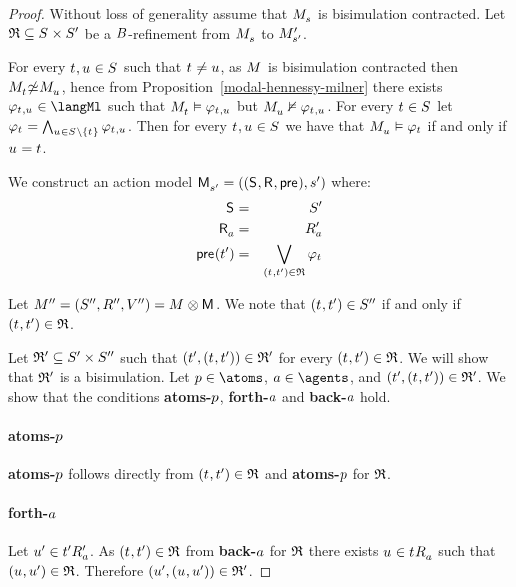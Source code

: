 \begin{proof}
Without loss of generality assume that $\kPModel{\kStateS}$ is bisimulation contracted.
Let $\refinement \subseteq \kStates \times \kStatesP$ be a $B$-refinement from $\kPModel{\kStateS}$ to ${M^{\prime}_{{s}^{\prime}}}$.

For every $\kStateT, \kStateU \in \kStates$ such that $\kStateT \neq \kStateU$, as $\kModel$ is bisimulation contracted then $\kPModel{\kStateT} \nbisimilar \kPModel{\kStateU}$, hence from Proposition~\ref{modal-hennessy-milner} there exists $\phi_{\kStateT, \kStateU} \in \langMl$ such that $\kPModel{\kStateT} \entails \phi_{\kStateT, \kStateU}$ but $\kPModel{\kStateU} \nentails \phi_{\kStateT, \kStateU}$.
For every $\kStateT \in \kStates$ let $\phi_{\kStateT} = \bigwedge_{\kStateU \in \kStates \setminus \{\kStateT\}} \phi_{\kStateT, \kStateU}$.
Then for every $\kStateT, \kStateU \in \kStates$ we have that $\kPModel{\kStateU} \entails \phi_{\kStateT}$ if and only if $\kStateU = \kStateT$.

We construct an action model $\aPModelAndTuple{\kStateSP}$ where:
\begin{eqnarray*}
    \aStates &=& \kStatesP\\
    \aAccessibilityA &=& \kAccessibilityPA\\
    \aPrecondition(\kStateTP) &=& \bigvee_{(\kStateT, \kStateTP) \in \refinement} \phi_{\kStateT}
\end{eqnarray*}

Let $\kModelAndTuplePP = \kModel \exec \aModel$. 
We note that $(\kStateT, \kStateTP) \in \kStatesPP$ if and only if $(\kStateT, \kStateTP) \in \refinement$.

Let $\mathfrak{R}' \subseteq {S^{\prime}} \times {S^{\prime\prime}}$ such that $(\kStateTP, (\kStateT, \kStateTP)) \in \bisimulation' $ for every $(\kStateT, \kStateTP) \in \refinement$.
We will show that $\mathfrak{R}'$ is a bisimulation.
Let $\atomP \in \atoms$, $\agentA \in \agents$, and $(\kStateTP, (\kStateT, \kStateTP)) \in \bisimulation'$.
We show that the conditions {\bf atoms-$p$}, {\bf forth-$a$} and {\bf back-$a$} hold.

\paragraph{atoms-$p$}
{\bf atoms-$p$} follows directly from $(\kStateT, \kStateTP) \in \refinement$ and {\bf atoms-$p$} for $\mathfrak{R}$.

\paragraph{forth-$a$}
Let ${u}^{\prime} \in {{t}^{\prime}} {R^{\prime}_{a}}$.
As $(\kStateT, \kStateTP) \in \refinement$ from {\bf back-$a$} for $\mathfrak{R}$ there exists $\kStateU \in \kSuccessorsA{\kStateT}$ such that $(\kStateU, \kStateUP) \in \refinement$.
Therefore $(\kStateUP, (\kStateU, \kStateUP)) \in \bisimulation'$.


\end{proof}
